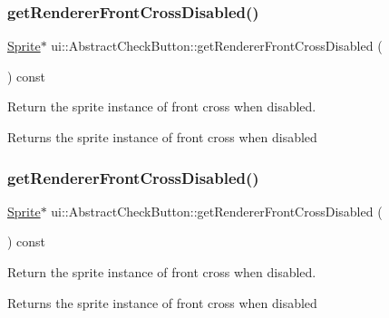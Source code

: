 \subsubsection{\texorpdfstring{get\+Renderer\+Front\+Cross\+Disabled()}{getRendererFrontCrossDisabled()}\hspace{0.1cm}{\footnotesize\ttfamily [1/2]}}
{\footnotesize\ttfamily \hyperlink{classSprite}{Sprite}$\ast$ ui\+::\+Abstract\+Check\+Button\+::get\+Renderer\+Front\+Cross\+Disabled (\begin{DoxyParamCaption}{ }\end{DoxyParamCaption}) const\hspace{0.3cm}{\ttfamily [inline]}}



Return the sprite instance of front cross when disabled. 

\begin{DoxyReturn}{Returns}
the sprite instance of front cross when disabled 
\end{DoxyReturn}
\mbox{\label{classui_1_1AbstractCheckButton_a6b8e3b669fd52665e7ec93157dd1de06}} 
\subsubsection{\texorpdfstring{get\+Renderer\+Front\+Cross\+Disabled()}{getRendererFrontCrossDisabled()}\hspace{0.1cm}{\footnotesize\ttfamily [2/2]}}
{\footnotesize\ttfamily \hyperlink{classSprite}{Sprite}$\ast$ ui\+::\+Abstract\+Check\+Button\+::get\+Renderer\+Front\+Cross\+Disabled (\begin{DoxyParamCaption}{ }\end{DoxyParamCaption}) const\hspace{0.3cm}{\ttfamily [inline]}}



Return the sprite instance of front cross when disabled. 

\begin{DoxyReturn}{Returns}
the sprite instance of front cross when disabled 
\end{DoxyReturn}
\mbox{\label{classui_1_1AbstractCheckButton_a51819285d8bfbe4b135dd09b8c382618}} 
